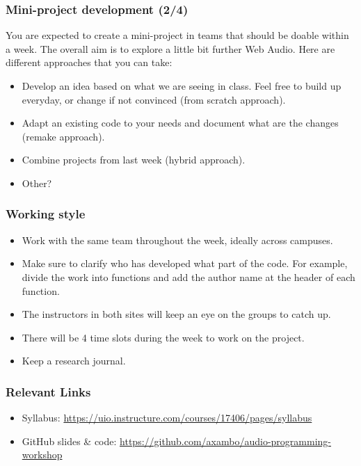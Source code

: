\documentclass[screen, aspectratio=43]{beamer}
\begin{document}
%
\begin{frame}
\frametitle{Mini-project development (2/4)}
You are expected to create a mini-project in teams that should be doable within a week. The overall aim is to explore a little bit further Web Audio. Here are different approaches that you can take:
\begin{itemize}
\item Develop an idea based on what we are seeing in class. Feel free to build up everyday, or change if not convinced (from scratch approach).
\item Adapt an existing code to your needs and document what are the changes (remake approach).
\item Combine projects from last week (hybrid approach).
\item Other?
\end{itemize}
\end{frame}
%
\begin{frame}
\frametitle{Working style}
\begin{itemize}
\item Work with the same team throughout the week, ideally across campuses. 
\item Make sure to clarify who has developed what part of the code. For example, divide the work into functions and add the author name at the header of each function.
\item The instructors in both sites will keep an eye on the groups to catch up.
\item There will be 4 time slots during the week to work on the project. 
\item Keep a research journal.
\end{itemize}
\end{frame}
%
\begin{frame}
\frametitle{Relevant Links}
\begin{itemize}
\item Syllabus: \url{https://uio.instructure.com/courses/17406/pages/syllabus}
\item GitHub slides \& code: \url{https://github.com/axambo/audio-programming-workshop}
\end{itemize}
\end{frame}
%
%
\end{document}
